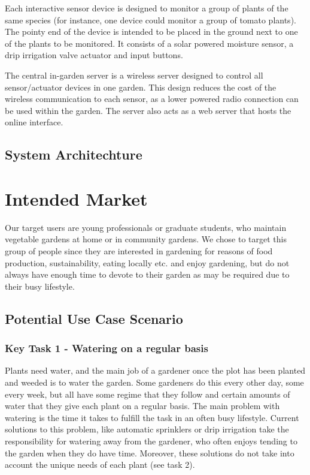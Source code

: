 \documentclass[11pt]{article}
\begin{document}
Each interactive sensor device is designed to monitor a group of plants of the same species (for instance, one device could monitor a group of tomato plants). The pointy end of the device is intended to be placed in the ground next to one of the plants to be monitored. It consists of a solar powered moisture sensor, a drip irrigation valve actuator and input buttons.

The central in-garden server is a wireless server designed to control all sensor/actuator devices in one garden. This design reduces the cost of the wireless communication to each sensor, as a lower powered radio connection can be used within the garden. The server also acts as a web server that hosts the online interface.

\subsection{System Architechture}

\section{Intended Market}

Our target users are young professionals or graduate students, who maintain vegetable gardens at home or in community gardens. We chose to target this group of people since they are interested in gardening for reasons of food production, sustainability, eating locally etc. and enjoy gardening, but do not always have enough time to devote to their garden as may be required due to their busy lifestyle.

\subsection{Potential Use Case Scenario}

\subsubsection{Key Task 1 - Watering on a regular basis}
Plants need water, and the main job of a gardener once the plot has been planted and weeded is to water the garden. Some gardeners do this every other day, some every week, but all have some regime that they follow and certain amounts of water that they give each plant on a regular basis. The main problem with watering is the time it takes to fulfill the task in an often busy lifestyle. Current solutions to this problem, like automatic sprinklers or drip irrigation take the responsibility for watering away from the gardener, who often enjoys tending to the garden when they do have time. Moreover, these solutions do not take into account the unique needs of each plant (see task 2).
\end{document}
